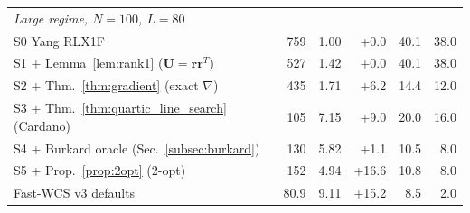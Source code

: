 \begin{table}[!t]
\begin{tabular*}{\columnwidth}{@{\extracolsep{\fill}}lrrrrr@{}}
\midrule
\multicolumn{6}{l}{\textit{Large regime, $N{=}100$, $L{=}80$}} \\
S0 Yang RLX1F~\cite{yang2018algorithm} & 759 & 1.00 & +0.0 & 40.1 & 38.0 \\
S1 + Lemma~\ref{lem:rank1} ($\mathbf{U}{=}\mathbf{r}\mathbf{r}^T$) & 527 & 1.42 & +0.0 & 40.1 & 38.0 \\
S2 + Thm.~\ref{thm:gradient} (exact $\nabla$) & 435 & 1.71 & +6.2 & 14.4 & 12.0 \\
S3 + Thm.~\ref{thm:quartic_line_search} (Cardano) & 105 & 7.15 & +9.0 & 20.0 & 16.0 \\
S4 + Burkard oracle (Sec.~\ref{subsec:burkard}) & 130 & 5.82 & +1.1 & 10.5 & 8.0 \\
S5 + Prop.~\ref{prop:2opt} (2-opt) & 152 & 4.94 & +16.6 & 10.8 & 8.0 \\
Fast-WCS v3 defaults & 80.9 & 9.11 & +15.2 & 8.5 & 2.0 \\
\bottomrule
\end{tabular*}
\end{table}

